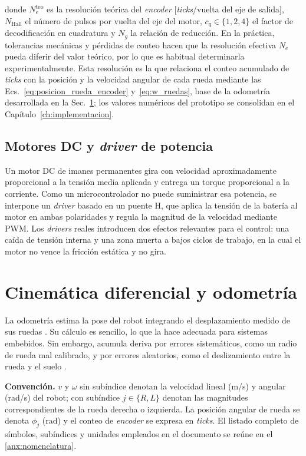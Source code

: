 \noindent donde $N_e^{\mathrm{teo}}$ es la resolución teórica del \textit{encoder}
[\textit{ticks}/vuelta del eje de salida], $N_{\mathrm{Hall}}$ el número de pulsos
por vuelta del eje del motor, $c_q\in\{1,2,4\}$ el factor de decodificación
en cuadratura y $N_g$ la relación de reducción. En la práctica, tolerancias
mecánicas y pérdidas de conteo hacen que la resolución efectiva $N_e$ pueda
diferir del valor teórico, por lo que es habitual determinarla
experimentalmente. Esta resolución es la que relaciona el conteo acumulado
de \textit{ticks} con la posición y la velocidad angular de cada rueda mediante las
Ecs.~\eqref{eq:posicion_rueda_encoder} y~\eqref{eq:w_ruedas}, base de la
odometría desarrollada en la Sec.~\ref{sec:odometria}; los valores numéricos
del prototipo se consolidan en el Capítulo~\ref{ch:implementacion}.

\subsection{Motores DC y \texorpdfstring{\textit{driver}}{driver} de potencia}
\label{sec:motores_marco}

Un motor DC de imanes permanentes gira con velocidad aproximadamente proporcional a la tensión media aplicada y entrega un torque proporcional a la corriente. Como un microcontrolador no puede suministrar esa potencia, se interpone un \textit{driver} basado en un puente H, que aplica la tensión de la batería al motor en ambas polaridades y regula la magnitud de la velocidad mediante \gls{PWM}. Los \textit{drivers} reales introducen dos efectos relevantes para el control: una caída de tensión interna y una zona muerta a bajos ciclos de trabajo, en la cual el motor no vence la fricción estática y no gira.

\section{Cinemática diferencial y odometría}
\label{sec:odometria}

La odometría estima la pose del robot integrando el desplazamiento medido de
sus ruedas \citep{ferreira2023differential}. Su cálculo es sencillo, lo que la hace
adecuada para sistemas embebidos. Sin embargo, acumula deriva por errores
sistemáticos, como un radio de rueda mal calibrado, y por errores aleatorios, como
el deslizamiento entre la rueda y el suelo \citep[Sec.~6.1]{corke2023}.

\noindent\textbf{Convención.} $v$ y $\omega$ sin subíndice denotan la
velocidad lineal (m/s) y angular (rad/s) del robot; con subíndice
$j\in\{R,L\}$ denotan las magnitudes correspondientes de la rueda derecha o
izquierda. La posición angular de rueda se denota $\phi_j$ (rad) y el conteo
de \textit{encoder} se expresa en \textit{ticks}. El listado completo de símbolos, subíndices
y unidades empleados en el documento se reúne en el \ref{anx:nomenclatura}.


